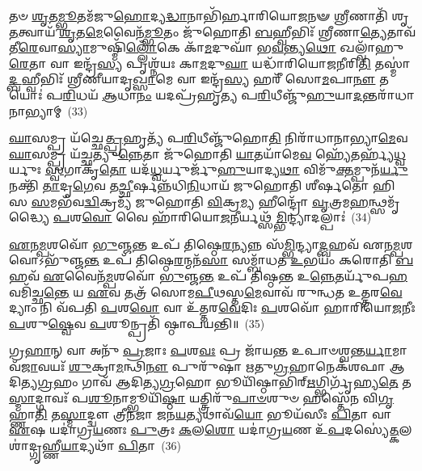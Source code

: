 𑌤𑍞 \ul{𑌶𑍃}\-𑌤\-\ul{𑌮𑍍𑌭𑍂}\-𑌤𑌮᳴𑌜𑍁\-\ul{𑌹𑍋}\-𑌦𑍍𑌯\-\ul{𑌦𑍍𑌧𑌾}\-𑌨𑌾𑌭𑌿᳴𑌰𑍍\mbox{}𑌹𑌾𑌰𑌿𑌯𑍋\-\ul{𑌜}\-𑌨𑍟 \ul{𑌶𑍍𑌰𑍀}\-𑌣𑌾𑌤𑌿᳴ 𑌶𑍃\-\ul{𑌤}\-𑌤𑍍𑌵𑌾𑌯᳴ \ul{𑌶𑍃}\-𑌤\-\ul{𑌮𑍇}\-𑌵𑍈𑌨᳴\-\ul{𑌮𑍍𑌭𑍂}\-𑌤𑌂 𑌜𑍁᳴𑌹𑍋𑌤𑌿 \ul{𑌬}\-𑌹𑍍𑌵𑍀𑌭𑌿𑌃᳴ 𑌶𑍍𑌰𑍀𑌣𑌾\-\ul{𑌤𑍍𑌯𑍇}\-𑌤𑌾𑌵᳴𑌤𑍀\-\-\ul{𑌰𑍇}\-𑌵𑌾\-\ul{𑌸𑍍𑌯𑌾}\-𑌮𑍁𑌷𑍍𑌮𑌿᳴\-\ul{𑌲𑍍𑌲𑍋𑌁}\-𑌕𑍇 𑌕𑌾᳴\-\ul{𑌮}\-𑌦𑍁𑌘𑌾᳴ 𑌭\-\ul{𑌵}\-𑌨𑍍𑌤𑍍𑌯\-\ul{𑌥𑍋} 𑌖𑌲𑍍𑌵𑌾᳴𑌹𑍁\-\ul{𑌰𑍇}\-𑌤𑌾 𑌵𑌾 𑌇𑌨𑍍𑌦𑍍𑌰᳴\-\ul{𑌸𑍍𑌯} 𑌪𑍃𑌶𑍍𑌨᳴𑌯𑌃 𑌕𑌾\-\ul{𑌮}\-𑌦𑍁\-\ul{𑌘𑌾} 𑌯𑌦𑍍𑌧𑌾᳴𑌰𑌿𑌯𑍋\-\ul{𑌜}\-𑌨𑍀𑌰𑌿\-\ul{𑌤𑌿} 𑌤𑌸𑍍𑌮𑌾॑\-\ul{𑌦𑍍𑌬}\-𑌹𑍍𑌵𑍀𑌭𑌿𑌃᳴ 𑌶𑍍𑌰𑍀𑌣𑍀𑌯𑌾𑌦𑍃\-\ul{𑌖𑍍𑌸𑌾}\-𑌮𑍇 𑌵𑌾 𑌇𑌨𑍍𑌦𑍍𑌰᳴\-\ul{𑌸𑍍𑌯} 𑌹𑌰𑍀᳴ 𑌸𑍋\-\ul{𑌮}\-𑌪𑌾\-\ul{𑌨𑍗} 𑌤𑌯𑍋𑌃॑ 𑌪\-\ul{𑌰𑌿}\-𑌧𑌯᳴ \ul{𑌆}\-𑌧𑌾\-\ul{𑌨𑌂} 𑌯𑌦𑌪𑍍𑌰᳴𑌹𑍃𑌤𑍍𑌯 𑌪\-\ul{𑌰𑌿}\-𑌧𑍀𑌞𑍍𑌜𑍁᳴\-\ul{𑌹𑍁}\-𑌯𑌾\-\ul{𑌦}\-𑌨𑍍𑌤𑌰𑌾᳴𑌧𑌾𑌨𑌾𑌭𑍍𑌯𑌾𑌮𑍍~(33)

\-\ul{𑌘𑌾}\-𑌸𑌮𑍍𑌪𑍍𑌰 𑌯᳴𑌚𑍍𑌛𑍇\-\ul{𑌤𑍍𑌪𑍍𑌰}\-𑌹𑍃𑌤𑍍𑌯᳴ 𑌪\-\ul{𑌰𑌿}\-𑌧𑍀𑌞𑍍𑌜𑍁᳴𑌹𑍋\-\ul{𑌤𑌿} 𑌨𑌿𑌰𑌾᳴𑌧𑌾𑌨𑌾𑌭𑍍𑌯𑌾\-\ul{𑌮𑍇}\-𑌵 \ul{𑌘𑌾}\-𑌸𑌮𑍍𑌪𑍍𑌰 𑌯᳴𑌚𑍍𑌛𑌤𑍍𑌯𑍁\-\ul{𑌨𑍍𑌨𑍇}\-𑌤𑌾 𑌜𑍁᳴𑌹𑍋𑌤𑌿 \ul{𑌯𑌾}\-𑌤𑌯𑌾᳴𑌮𑍇\-\ul{𑌵} 𑌹𑍍𑌯𑍇᳴𑌤𑌰𑍍\mbox{}𑌹𑍍𑌯᳴\-\ul{𑌧𑍍𑌵}\-𑌰𑍍𑌯𑍁𑌃 \ul{𑌸𑍍𑌵}\-𑌗𑌾𑌕𑍃᳴\-\ul{𑌤𑍋} 𑌯𑌦᳴\-\ul{𑌧𑍍𑌵}\-𑌰𑍍𑌯𑍁𑌰𑍍𑌜𑍁᳴\-\ul{𑌹𑍁}\-𑌯𑌾𑌦𑍍𑌯\-\ul{𑌥𑌾} 𑌵𑌿𑌮𑍁᳴\-\ul{𑌕𑍍𑌤}\-𑌮𑍍𑌪𑍁𑌨᳴\-\ul{𑌰𑍍𑌯𑍁}\-𑌨𑌕𑍍𑌤𑌿᳴ \ul{𑌤𑌾}\-𑌦𑍃\-\ul{𑌗𑍇}\-𑌵 𑌤\-\ul{𑌚𑍍𑌛𑍀}\-𑌰𑍍\mbox{}𑌷𑌨𑍍𑌨᳴𑌧𑌿\-\ul{𑌨𑌿}\-𑌧𑌾𑌯᳴ 𑌜𑍁𑌹𑍋𑌤𑌿 𑌶𑍀𑌰𑍍\mbox{}\-\ul{𑌷}\-𑌤𑍋 𑌹𑌿 𑌸 \ul{𑌸}\-𑌮𑌭᳴𑌵\-\ul{𑌦𑍍𑌵𑌿}\-𑌕𑍍𑌰𑌮𑍍𑌯᳴ 𑌜𑍁𑌹𑍋𑌤𑌿 \ul{𑌵𑌿}\-𑌕𑍍𑌰\-\ul{𑌮𑍍𑌯} 𑌹𑍀𑌨𑍍𑌦𑍍𑌰𑍋᳴ \ul{𑌵𑍃}\-𑌤𑍍𑌰𑌮\-\ul{𑌹}\-𑌨𑍍𑌥𑍍𑌸𑌮𑍃᳴𑌦𑍍𑌧𑍍𑌯𑍈 \ul{𑌪}\-𑌶\-\ul{𑌵𑍋} 𑌵𑍈 𑌹𑌾᳴𑌰𑌿𑌯𑍋\-\ul{𑌜}\-𑌨𑍀𑌰𑍍𑌯𑌥𑍍𑌸᳴\-\ul{𑌮𑍍𑌭𑌿}\-𑌨𑍍𑌦𑍍𑌯𑌾𑌦𑌲𑍍𑌪𑌾𑌃॑~(34)

\-\ul{𑌏}\-\-\ul{𑌨}\-\-\ul{𑌮𑍍𑌪}\-𑌶𑌵𑍋᳴ \ul{𑌭𑍁}\-𑌞𑍍𑌜\-\ul{𑌨𑍍𑌤} 𑌉𑌪᳴ 𑌤𑌿𑌷𑍍𑌠𑍇\-\ul{𑌰}\-\-\ul{𑌨𑍍}\-𑌯𑌨𑍍𑌨 𑌸᳴\-\ul{𑌮𑍍𑌭𑌿}\-𑌨𑍍𑌦𑍍𑌯𑌾\-\ul{𑌦𑍍𑌬}\-𑌹𑌵᳴ 𑌏𑌨\-\ul{𑌮𑍍𑌪}\-𑌶𑌵𑍋\-𑌽𑌭𑍁᳴𑌞𑍍𑌜\-\ul{𑌨𑍍𑌤} 𑌉𑌪᳴ 𑌤𑌿𑌷𑍍𑌠𑍇\-\ul{𑌰}\-𑌨𑍍𑌮𑌨᳴\-\ul{𑌸𑌾} 𑌸𑌮𑍍𑌬𑌾᳴𑌧𑌤 \ul{𑌉}\-𑌭𑌯𑌂᳴ 𑌕𑌰𑍋𑌤𑌿 \ul{𑌬}\-𑌹𑌵᳴ \ul{𑌏}\-𑌵𑍈𑌨᳴\-\ul{𑌮𑍍𑌪}\-𑌶𑌵𑍋᳴ \ul{𑌭𑍁}\-𑌞𑍍𑌜\-\ul{𑌨𑍍𑌤} 𑌉𑌪᳴ 𑌤𑌿𑌷𑍍𑌠𑌨𑍍𑌤 𑌉\-\ul{𑌨𑍍𑌨𑍇}\-𑌤𑌰𑍍𑌯𑍁᳴𑌪\-\ul{𑌹}\-𑌵𑌮𑌿᳴𑌚𑍍𑌛\-\ul{𑌨𑍍𑌤𑍇} 𑌯 \ul{𑌏}\-𑌵 𑌤𑌤𑍍𑌰᳴ 𑌸𑍋𑌮\-\ul{𑌪𑍀}\-𑌥𑌸𑍍𑌤\-\ul{𑌮𑍇}\-𑌵𑌾𑌵᳴ 𑌰𑍁𑌨𑍍𑌧𑌤 𑌉𑌤𑍍𑌤𑌰\-\ul{𑌵𑍇}\-𑌦𑍍𑌯𑌾𑌂 𑌨𑌿 𑌵᳴𑌪𑌤𑌿 \ul{𑌪}\-𑌶\-\ul{𑌵𑍋} 𑌵𑌾 𑌉᳴𑌤𑍍𑌤𑌰\-\ul{𑌵𑍇}\-𑌦𑌿𑌃 \ul{𑌪}\-𑌶𑌵𑍋᳴ 𑌹𑌾𑌰𑌿𑌯𑍋\-\ul{𑌜}\-𑌨𑍀𑌃 \ul{𑌪}\-𑌶𑍁\-\ul{𑌷𑍍𑌵𑍇}\-𑌵 \ul{𑌪}\-𑌶𑍂𑌨𑍍𑌪𑍍𑌰𑌤𑌿᳴ 𑌷𑍍𑌠𑌾𑌪𑌯𑌨𑍍𑌤𑌿॥~(35)

{\anuvakamend[{\-\ul{𑌅}\-\-\ul{𑌶𑍍𑌰𑍀}\-\-\ul{𑌣𑌾}\-\-\ul{𑌦}\-𑌨𑍍𑌤𑌰𑌾᳴𑌧𑌾𑌨𑌾\-\ul{𑌭𑍍𑌯𑌾}\-𑌮𑌲𑍍𑌪𑌾𑌃॑ 𑌸𑍍𑌥𑌾𑌪𑌯𑌨𑍍𑌤𑌿}]}%

𑌗𑍍𑌰\-\ul{𑌹𑌾}\-𑌨𑍍 𑌵𑌾 𑌅𑌨𑍁᳴ \ul{𑌪𑍍𑌰}\-𑌜𑌾𑌃 \ul{𑌪}\-𑌶\-\ul{𑌵𑌃} 𑌪𑍍𑌰 𑌜𑌾᳴𑌯𑌨𑍍𑌤 𑌉𑌪𑌾𑍞𑌶𑍍𑌵𑌨𑍍𑌤\-\ul{𑌰𑍍𑌯𑌾}\-𑌮𑌾𑌵᳴\-\ul{𑌜𑌾}\-𑌵𑌯𑌃᳴ \ul{𑌶𑍁}\-𑌕𑍍𑌰𑌾\-\ul{𑌮}\-𑌨𑍍𑌥𑌿\-\ul{𑌨𑍗} 𑌪𑍁𑌰𑍁᳴𑌷𑌾 𑌋𑌤𑍁\-\ul{𑌗𑍍𑌰}\-𑌹𑌾𑌨𑍇𑌕᳴𑌶𑌫𑌾 𑌆𑌦𑌿𑌤𑍍𑌯\-\ul{𑌗𑍍𑌰}\-𑌹𑌂 𑌗𑌾𑌵᳴ 𑌆𑌦𑌿𑌤𑍍𑌯\-\ul{𑌗𑍍𑌰}\-𑌹𑍋 𑌭𑍂𑌯𑌿᳴𑌷𑍍𑌠𑌾𑌭𑌿𑌰𑍍\mbox{}\-\ul{𑌋}\-𑌗𑍍𑌭𑌿𑌰𑍍𑌗𑍃᳴𑌹𑍍𑌯\-\ul{𑌤𑍇} 𑌤\-\ul{𑌸𑍍𑌮𑌾}\-𑌦𑍍𑌗𑌾𑌵𑌃᳴ 𑌪\-\ul{𑌶𑍂}\-𑌨𑌾𑌮𑍍𑌭𑍂𑌯𑌿᳴\-\ul{𑌷𑍍𑌠𑌾} 𑌯𑌤𑍍𑌤𑍍𑌰𑌿𑌰𑍁᳴\-\ul{𑌪𑌾}\-\-\ul{𑍞}\-𑌶𑍁𑍞 𑌹𑌸𑍍𑌤𑍇᳴𑌨 𑌵𑌿\-\ul{𑌗𑍃}\-𑌹𑍍𑌣𑌾\-\ul{𑌤𑌿} 𑌤\-\ul{𑌸𑍍𑌮𑌾}\-𑌦𑍍𑌦𑍍𑌵𑍗 𑌤𑍍𑌰𑍀\-\ul{𑌨}\-𑌜𑌾 \ul{𑌜}\-𑌨\-\ul{𑌯}\-𑌤𑍍𑌯𑌥𑌾𑌵᳴\-\ul{𑌯𑍋} 𑌭𑍂𑌯᳴𑌸𑍀𑌃 \ul{𑌪𑌿}\-𑌤𑌾 𑌵𑌾 \ul{𑌏}\-𑌷 𑌯𑌦𑌾॑𑌗𑍍𑌰\-\ul{𑌯}\-𑌣𑌃 \ul{𑌪𑍁}\-𑌤𑍍𑌰𑌃 \ul{𑌕}\-𑌲\-\ul{𑌶𑍋} 𑌯𑌦𑌾॑𑌗𑍍𑌰\-\ul{𑌯}\-𑌣 𑌉᳴\-\ul{𑌪}\-𑌦𑌸𑍍𑌯𑍇॑\-\ul{𑌤𑍍𑌕}\-𑌲𑌶𑌾॑𑌦𑍍𑌗𑍃𑌹𑍍𑌣𑍀\-\ul{𑌯𑌾}\-𑌦𑍍𑌯𑌥𑌾᳴ \ul{𑌪𑌿}\-𑌤𑌾~(36)


